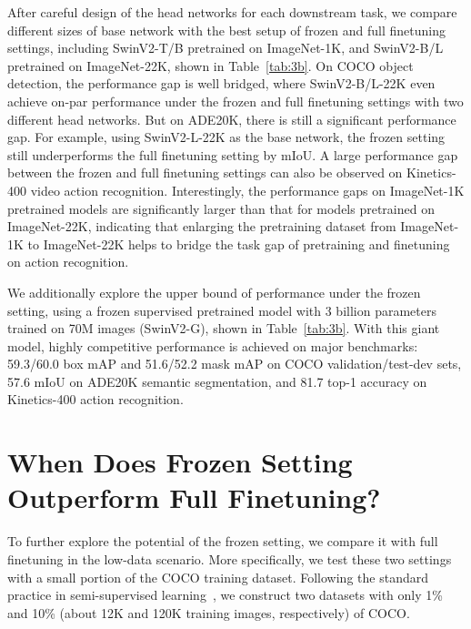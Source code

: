 \documentclass{article}
\begin{document}
After careful design of the head networks for each downstream task, we compare different sizes of base network with the best setup of frozen and full finetuning settings, including SwinV2-T/B pretrained on ImageNet-1K, and SwinV2-B/L pretrained on ImageNet-22K, shown in Table~\ref{tab:3b}. On COCO object detection, the performance gap is well bridged, where SwinV2-B/L-22K even achieve on-par performance under the frozen and full finetuning settings with two different head networks. But on ADE20K, there is still a significant performance gap. For example, using SwinV2-L-22K as the base network, the frozen setting still underperforms the full finetuning setting by  mIoU. A large performance gap between the frozen and full finetuning settings can also be observed on Kinetics-400 video action recognition. Interestingly, the performance gaps on ImageNet-1K pretrained models are significantly larger than that for models pretrained on ImageNet-22K, indicating that enlarging the pretraining dataset from ImageNet-1K to ImageNet-22K helps to bridge the task gap of pretraining and finetuning on action recognition.

We additionally explore the upper bound of performance under the frozen setting, using a frozen supervised pretrained model with 3 billion parameters trained on 70M images (SwinV2-G), shown in Table~\ref{tab:3b}. With this giant model, highly competitive performance is achieved on major benchmarks: 59.3/60.0 box mAP and 51.6/52.2 mask mAP on COCO validation/test-dev sets, 57.6 mIoU on ADE20K semantic segmentation, and 81.7 top-1 accuracy on Kinetics-400 action recognition. 

\section{When Does Frozen Setting Outperform Full Finetuning?}

To further explore the potential of the frozen setting, we compare it with full finetuning in the low-data scenario. More specifically, we test these two settings with a small portion of the COCO training dataset. Following the standard practice in semi-supervised learning~\cite{sohn2020simple_semi, xu2021softteacher}, we construct two datasets with only 1\% and 10\% (about 12K and 120K training images, respectively) of COCO. 
\end{document}
